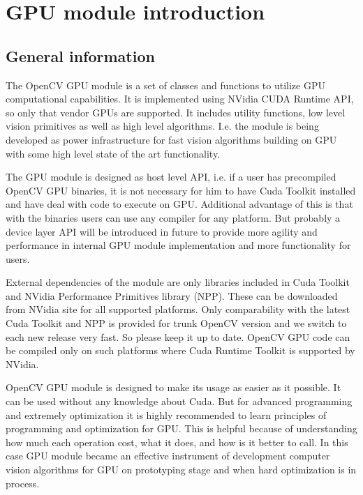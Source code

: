 \section {GPU module introduction}

\subsection{General information}

The OpenCV GPU module is a set of classes and functions to utilize GPU computational capabilities. It is implemented using NVidia CUDA Runtime API, so only that vendor GPUs are supported. It includes utility functions, low level vision primitives as well as high level algorithms. I.e. the module is being developed as power infrastructure for fast vision algorithms building on GPU with some high level state of the art functionality.  

The GPU module is designed as host level API, i.e. if a user has precompiled OpenCV GPU binaries, it is not necessary for him to have Cuda Toolkit installed and have deal with code to execute on GPU. Additional advantage of this is that with the binaries users can use any compiler for any platform. But probably a device layer API will be introduced in future to provide more agility and performance in internal GPU module implementation and more functionality for users.

External dependencies of the module are only libraries included in Cuda Toolkit and NVidia Performance Primitives library (NPP). These can be downloaded from NVidia site for all supported platforms. Only comparability with the latest Cuda Toolkit and NPP is provided for trunk OpenCV version and we switch to each new release very fast. So please keep it up to date. OpenCV GPU code can be compiled only on such platforms where Cuda Runtime Toolkit is supported by NVidia.

OpenCV GPU module is designed to make its usage as easier as it possible. It can be used without any knowledge about Cuda. But for advanced programming and extremely optimization it is highly recommended to learn principles of programming and optimization for GPU. This is helpful because of understanding how much each operation cost, what it does, and how is it better to call. In this case GPU module became an effective instrument of development computer vision algorithms for GPU on prototyping stage and when hard optimization is in process.

